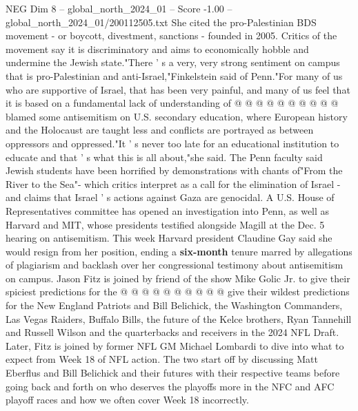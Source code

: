 \begin{textsample}{NEG Dim 8 – global\_north\_2024\_01 – Score -1.00 – global\_north\_2024\_01/200112505.txt}
She cited the pro-Palestinian BDS movement - or boycott, divestment, sanctions - founded in 2005.
Critics of the movement say it is discriminatory and aims to economically hobble and undermine the Jewish state."There ' s a very, very strong sentiment on campus that is pro-Palestinian and anti-Israel,"Finkelstein said of Penn."For many of us who are supportive of Israel, that has been very painful, and many of us feel that it is based on a fundamental lack of understanding of @ @ @ @ @ @ @ @ @ @ blamed some antisemitism on U.S. secondary education, where European history and the Holocaust are taught less and conflicts are portrayed as between oppressors and oppressed."It ' s never too late for an educational institution to educate and that ' s what this is all about,"she said.
The Penn faculty said Jewish students have been horrified by demonstrations with chants of"From the River to the Sea"- which critics interpret as a call for the elimination of Israel - and claims that Israel ' s actions against Gaza are genocidal.
A U.S.
House of Representatives committee has opened an investigation into Penn, as well as Harvard and MIT, whose presidents testified alongside Magill at the Dec. 5 hearing on antisemitism.
This week Harvard president Claudine Gay said she would resign from her position, ending a \textbf{six-month} tenure marred by allegations of plagiarism and backlash over her congressional testimony about antisemitism on campus.
Jason Fitz is joined by friend of the show Mike Golic Jr. to give their spiciest predictions for the @ @ @ @ @ @ @ @ @ @ give their wildest predictions for the New England Patriots and Bill Belichick, the Washington Commanders, Las Vegas Raiders, Buffalo Bills, the future of the Kelce brothers, Ryan Tannehill and Russell Wilson and the quarterbacks and receivers in the 2024 NFL Draft.
Later, Fitz is joined by former NFL GM Michael Lombardi to dive into what to expect from Week 18 of NFL action.
The two start off by discussing Matt Eberflus and Bill Belichick and their futures with their respective teams before going back and forth on who deserves the playoffs more in the NFC and AFC playoff races and how we often cover Week 18 incorrectly.

\end{textsample}
